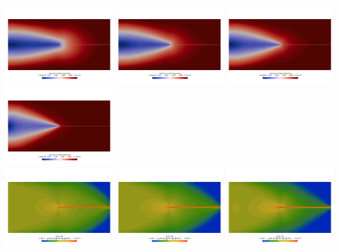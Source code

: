 \begin{center}
\includegraphics[width=4cm]{python_codes/fieldstone_87/results/experiment_07/vel_n01}
\includegraphics[width=4cm]{python_codes/fieldstone_87/results/experiment_07/vel_n02}
\includegraphics[width=4cm]{python_codes/fieldstone_87/results/experiment_07/vel_n03}
\includegraphics[width=4cm]{python_codes/fieldstone_87/results/experiment_07/vel_n10}\\
\includegraphics[width=4cm]{python_codes/fieldstone_87/results/experiment_07/sr_n01}
\includegraphics[width=4cm]{python_codes/fieldstone_87/results/experiment_07/sr_n02}
\includegraphics[width=4cm]{python_codes/fieldstone_87/results/experiment_07/sr_n03}

\end{center}
